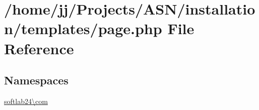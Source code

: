 \hypertarget{installation_2templates_2page_8php}{}\section{/home/jj/\+Projects/\+A\+S\+N/installation/templates/page.php File Reference}
\label{installation_2templates_2page_8php}
\subsection*{Namespaces}
\begin{DoxyCompactItemize}
\item 
 \hyperlink{namespacesoftlab24_1_1com}{softlab24\textbackslash{}com}
\end{DoxyCompactItemize}
